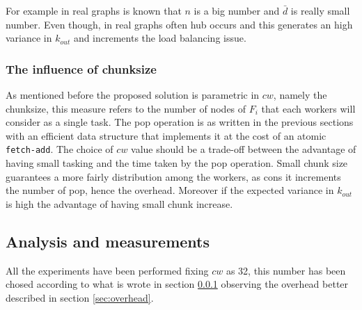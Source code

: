 For example in real graphs is known that $n$ is a big number and $\bar{d}$ is really small number. Even though, in real graphs often hub occurs and this generates an high variance in $k_{out}$ and increments the load balancing issue.

\subsubsection{The influence of chunksize}
\label{sec:chunksize}
As mentioned before the proposed solution is parametric in $cw$, namely the chunksize, this measure refers to the number of nodes of $F_i$ that each workers will consider as a single task. The pop operation is as written in the previous sections with an efficient data structure that implements it at the cost of an atomic \texttt{fetch-add}. The choice of $cw$ value should be a trade-off between the advantage of having small tasking and the time taken by the pop operation. Small chunk size guarantees a more fairly distribution among the workers, as cons it increments the number of pop, hence the overhead. Moreover if the expected variance in $k_{out}$ is high the advantage of having small chunk increase.
\subsection{Analysis and measurements}
All the experiments have been performed fixing $cw$ as 32, this number has been chosed according to what is wrote in section \ref{sec:chunksize} observing the overhead better described in section \ref{sec:overhead}.
